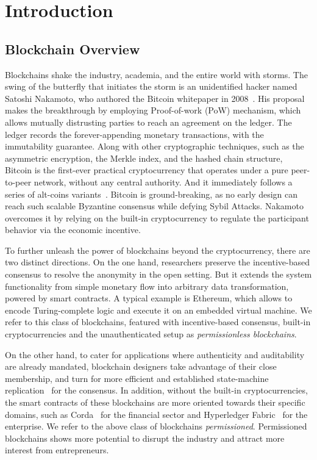 
\chapter{Introduction}
\label{sec:intro}
\section{Blockchain Overview}
Blockchains shake the industry, academia, and the entire world with storms. 
The swing of the butterfly that initiates the storm is an unidentified hacker named Satoshi Nakamoto, who authored the Bitcoin whitepaper in 2008~\cite{nakamoto2019bitcoin}. 
His proposal makes the breakthrough by employing Proof-of-work (PoW) mechanism, which allows mutually distrusting parties to reach an agreement on the ledger.
The ledger records the forever-appending monetary transactions, with the immutability guarantee. 
Along with other cryptographic techniques, such as the asymmetric encryption, the Merkle index, and the hashed chain structure, Bitcoin is the first-ever practical cryptocurrency that operates under a pure peer-to-peer network, without any central authority. And it immediately follows a series of alt-coins variants~\cite{wiki:List_of_cryptocurrencies}. 
Bitcoin is ground-breaking, as no early design can reach such scalable Byzantine consensus while defying Sybil Attacks. 
Nakamoto overcomes it by relying on the built-in cryptocurrency to regulate the participant behavior via the economic incentive. 

To further unleash the power of blockchains beyond the cryptocurrency, there are two distinct directions. 
On the one hand, researchers preserve the incentive-based consensus to resolve the anonymity in the open setting. 
But it extends the system functionality from simple monetary flow into arbitrary data transformation, powered by smart contracts. 
A typical example is Ethereum, which allows to encode Turing-complete logic and execute it on an embedded virtual machine. 
We refer to this class of blockchains, featured with incentive-based consensus, built-in cryptocurrencies and the unauthenticated setup as \textit{permissionless blockchains}. 

On the other hand, to cater for applications where authenticity and auditability are already mandated, blockchain designers take advantage of their close membership, and turn for more efficient and established state-machine replication~\cite{schneider1990implementing} for the consensus. 
In addition, without the built-in cryptocurrencies, the smart contracts of these blockchains are more oriented towards their specific domains, such as Corda~\cite{hearn2016corda} for the financial sector and Hyperledger Fabric~\cite{androulaki2018hyperledger} for the enterprise. 
We refer to the above class of blockchains \textit{permissioned}.
Permissioned blockchains shows more potential to disrupt the industry and attract more interest from entrepreneurs. 


